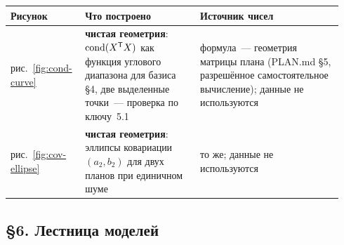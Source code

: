 \begin{center}
\footnotesize
\setlength{\tabcolsep}{5pt}
\begin{tabular}{@{}p{0.20\linewidth}p{0.33\linewidth}>{\raggedright\arraybackslash}p{0.41\linewidth}@{}}
\toprule
\textbf{Рисунок} & \textbf{Что построено} & \textbf{Источник чисел} \\
\midrule
рис.~\ref{fig:cond-curve} & \textbf{чистая геометрия}: $\operatorname{cond}(X^{\mathsf T}X)$ как функция
углового диапазона для базиса §4, две выделенные точки~--- проверка по ключу~5.1 & формула~---
геометрия матрицы плана (PLAN.md §5, разрешённое самостоятельное вычисление); данные не
используются \\
рис.~\ref{fig:cov-ellipse} & \textbf{чистая геометрия}: эллипсы ковариации $(a_2,b_2)$ для двух
планов при единичном шуме & то же; данные не используются \\
\bottomrule
\end{tabular}
\end{center}

\subsection*{§6. Лестница моделей}

